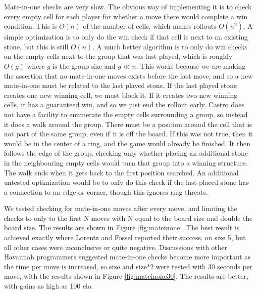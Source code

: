 Mate-in-one checks are very slow. The obvious way of implementing it is to check every empty cell for each player for whether a move there would complete a win condition. This is $O(n)$ of the number of cells, which makes rollouts $O(n^2)$. A simple optimization is to only do the win check if that cell is next to an existing stone, but this is still $O(n)$. A much better algorithm is to only do win checks on the empty cells next to the group that was last played, which is roughly $O(g)$ where $g$ is the group size and $g \ll n$. This works because we are making the assertion that no mate-in-one moves exists before the last move, and so a new mate-in-one must be related to the last played stone. If the last played stone creates one new winning cell, we must block it. If it creates two new winning cells, it has a guaranteed win, and so we just end the rollout early. Castro does not have a facility to enumerate the empty cells surrounding a group, so instead it does a walk around the group. There must be a position around the cell that is not part of the same group, even if it is off the board. If this was not true, then it would be in the center of a ring, and the game would already be finished. It then follows the edge of the group, checking only whether placing an additional stone in the neighbouring empty cells would turn that group into a winning structure. The walk ends when it gets back to the first position searched. An additional untested optimization would be to only do this check if the last placed stone has a connection to an edge or corner, though this ignores ring threats.

We tested checking for mate-in-one moves after every move, and limiting the checks to only to the first N moves with N equal to the board size and double the board size. The results are shown in Figure \ref{fig:mateinone}. The best result is achieved exactly where Lorentz and Fossel reported their success, on size 5, but all other cases were inconclusive or quite negative. Discussions with other Havannah programmers suggested mate-in-one checks become more important as the time per move is increased, so size and size*2 were tested with 30 seconds per move, with the results shown in Figure \ref{fig:mateinone30}. The results are better, with gains as high as 100 elo.

